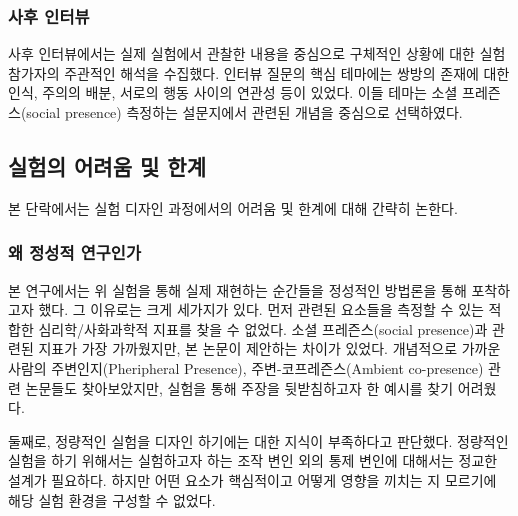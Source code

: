 \subsubsection{사후 인터뷰}

사후 인터뷰에서는 실제 실험에서 관찰한 내용을 중심으로 구체적인 상황에 대한 실험 참가자의 주관적인 해석을 수집했다. 인터뷰 질문의 핵심 테마에는 쌍방의 존재에 대한 인식, 주의의 배분, 서로의 행동 사이의 연관성 등이 있었다. 이들 테마는 소셜 프레즌스(social presence) 측정하는 설문지\cite{biocca2001networked}에서  관련된 개념을 중심으로 선택하였다.


\subsection{실험의 어려움 및 한계}
\label{sec:expUser_hard}


본 단락에서는 실험 디자인 과정에서의 어려움 및 한계에 대해 간략히 논한다.


\subsubsection{왜 정성적 연구인가}

본 연구에서는 위 실험을 통해 \sysname\이 실제 \concept\를 재현하는 순간들을 정성적인 방법론을 통해 포착하고자 했다. 그 이유로는 크게 세가지가 있다. 먼저  관련된 요소들을 측정할 수 있는 적합한 심리학/사화과학적 지표를 찾을 수 없었다. 소셜 프레즌스(social presence)과 관련된 지표\cite{biocca2001networked}가 가장 가까웠지만, 본 논문이 제안하는  차이가 있었다. 개념적으로 가까운 사람의 주변인지(Pheripheral Presence), 주변-코프레즌스(Ambient co-presence) 관련 논문들도 찾아보았지만, 실험을 통해 주장을 뒷받침하고자 한 예시를 찾기 어려웠다.

둘째로, 정량적인 실험을 디자인 하기에는  대한 지식이 부족하다고 판단했다. 정량적인 실험을 하기 위해서는 실험하고자 하는 조작 변인 외의 통제 변인에 대해서는 정교한 설계가 필요하다. 하지만 어떤 요소가 핵심적이고  어떻게 영향을 끼치는 지 모르기에 해당 실험 환경을 구성할 수 없었다.

